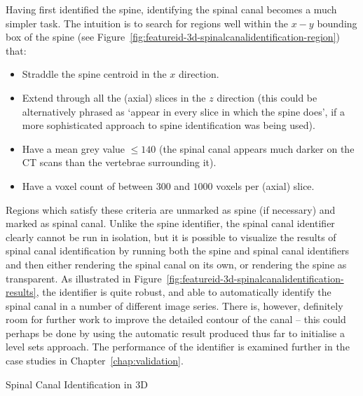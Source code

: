 \noindent Having first identified the spine, identifying the spinal canal becomes a much simpler task. The intuition is to search for regions well within the $x-y$ bounding box of the spine (see Figure~\ref{fig:featureid-3d-spinalcanalidentification-region}) that:
%
\begin{itemize}

\item Straddle the spine centroid in the $x$ direction.
\item Extend through all the (axial) slices in the $z$ direction (this could be alternatively phrased as `appear in every slice in which the spine does', if a more sophisticated approach to spine identification was being used).
\item Have a mean grey value $\le 140$ (the spinal canal appears much darker on the CT scans than the vertebrae surrounding it).
\item Have a voxel count of between $300$ and $1000$ voxels per (axial) slice.

\end{itemize}
%
Regions which satisfy these criteria are unmarked as spine (if necessary) and marked as spinal canal. Unlike the spine identifier, the spinal canal identifier clearly cannot be run in isolation, but it is possible to visualize the results of spinal canal identification by running both the spine and spinal canal identifiers and then either rendering the spinal canal on its own, or rendering the spine as transparent. As illustrated in Figure~\ref{fig:featureid-3d-spinalcanalidentification-results}, the identifier is quite robust, and able to automatically identify the spinal canal in a number of different image series. There is, however, definitely room for further work to improve the detailed contour of the canal -- this could perhaps be done by using the automatic result produced thus far to initialise a level sets approach. The performance of the identifier is examined further in the case studies in Chapter~\ref{chap:validation}.

\begin{stulisting}[!b]
\caption{Spinal Canal Identification in 3D}
\label{code:featureid-3d-spinalcanalidentification}

\end{stulisting}

